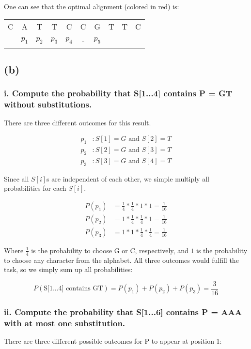 \documentclass[%
   10pt,              %
   nenglish,           %
   a4paper,           %
   DIV11,             %
]{scrartcl}%
\begin{document}
\noindent One can see that the optimal alignment (colored in red) is:

\begin{table}[h]
\centering
\begin{tabular}{cccccccccc}
 C&A&T&T&C&C&G&T&T&C\\
  &$p_1$&$p_2$&$p_3$&$p_4$&-&$p_5$& & & 
\end{tabular}
\end{table}


\subsection*{(b)}
\subsubsection*{i. Compute the probability that S[1...4] contains P = GT without substitutions.}
There are three different outcomes for this result. 

\begin{align}
 p_1 &: S[1] = G\textrm{ and }S[2] =T \nonumber \\
 p_2 &: S[2] = G\textrm{ and }S[3] =T \nonumber \\
 p_3 &: S[3] = G\textrm{ and }S[4] =T \nonumber 
\end{align}

\noindent Since all $S[i]$s are independent of each other, we simple multiply all probabilities for 
each $S[i]$.

\begin{align}
 P(p_1) &= \frac{1}{4} * \frac{1}{4} * 1 * 1 = \frac{1}{16} \nonumber \\
 P(p_2) &= 1 * \frac{1}{4} * \frac{1}{4} * 1 = \frac{1}{16} \nonumber \\
 P(p_3) &= 1 * 1 * \frac{1}{4} * \frac{1}{4} = \frac{1}{16} \nonumber 
\end{align}

\noindent Where $\frac{1}{4}$ is the probability to choose G or C, respectively, and $1$ is the 
probability to choose any character from the alphabet. All three outcomes would fulfill the task, 
so we simply sum up all probabilities:

\begin{equation}
 P(\textrm{S[1...4] contains GT}) = P(p_1) + P(p_2) + P(p_3) = \frac{3}{16} \nonumber
\end{equation}

\subsubsection*{ii. Compute the probability that S[1...6] contains P = AAA with at most one substitution.}
There are three different possible outcomes for P to appear at position 1:
\end{document}
